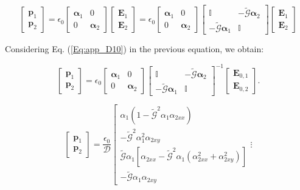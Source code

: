 \begin{equation}
\begin{bmatrix}\mathbf{p}_{1}\\
\mathbf{p}_{2}
\end{bmatrix}=\epsilon_{0}\begin{bmatrix}\boldsymbol{\alpha}_{1} & 0\\
0 & \boldsymbol{\alpha}_{2}
\end{bmatrix}\begin{bmatrix}\mathbf{E}_{1}\\
\mathbf{E}_{2}
\end{bmatrix}=\epsilon_{0}\begin{bmatrix}\boldsymbol{\alpha}_{1} & 0\\
0 & \boldsymbol{\alpha}_{2}
\end{bmatrix}\begin{bmatrix}\mathbb{I} & -\tilde{\mathcal{G}}\boldsymbol{\alpha}_{2}\\
-\tilde{\mathcal{G}}\boldsymbol{\alpha}_{1} & \mathbb{I}
\end{bmatrix}\begin{bmatrix}\mathbf{E}_{1}\\
\mathbf{E}_{2}
\end{bmatrix}\nonumber
\end{equation}

Considering Eq. (\ref{Eq:app_D10}) in the previous equation, we obtain:

\begin{equation}
\begin{bmatrix}\mathbf{p}_{1}\\
\mathbf{p}_{2}
\end{bmatrix}=\epsilon_{0}\begin{bmatrix}\boldsymbol{\alpha}_{1} & 0\\
0 & \boldsymbol{\alpha}_{2}
\end{bmatrix}\begin{bmatrix}\mathbb{I} & -\tilde{\mathcal{G}}\boldsymbol{\alpha}_{2}\\
-\tilde{\mathcal{G}}\boldsymbol{\alpha}_{1} & \mathbb{I}
\end{bmatrix}^{-1}\left[\begin{array}{c}
\mathbf{E}_{0,1}\\
\mathbf{E}_{0,2}
\end{array}\right].\nonumber
\end{equation}

\[
\begin{bmatrix}\mathbf{p}_{1}\\
\mathbf{p}_{2}
\end{bmatrix}=\frac{\epsilon_{0}}{\mathcal{D}}\left[\begin{array}{c}
\alpha_{1}\left(1-\tilde{\mathcal{G}}^{2}\alpha_{1}\alpha_{2xx}\right)\\
-\tilde{\mathcal{G}}^{2}\alpha_{1}^{2}\alpha_{2xy}\\
\tilde{\mathcal{G}}\alpha_{1}\left[\alpha_{2xx}-\tilde{\mathcal{G}}^{2}\alpha_{1}\left(\alpha_{2xx}^{2}+\alpha_{2xy}^{2}\right)\right]\\
-\tilde{\mathcal{G}}\alpha_{1}\alpha_{2xy}
\end{array}\vdots\right.
\]

